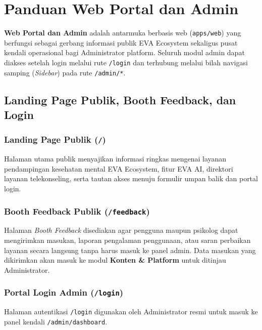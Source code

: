\chapter{Panduan Web Portal dan Admin}
\label{chap:web-portal-admin}

\textbf{Web Portal dan Admin} adalah antarmuka berbasis web (\texttt{apps/web}) yang berfungsi sebagai gerbang informasi publik EVA Ecosystem sekaligus pusat kendali operasional bagi Administrator platform. Seluruh modul admin dapat diakses setelah login melalui rute \texttt{/login} dan terhubung melalui bilah navigasi samping (\textit{Sidebar}) pada rute \texttt{/admin/*}.

\section{Landing Page Publik, Booth Feedback, dan Login}

\subsection{Landing Page Publik (\texttt{/})}
Halaman utama publik menyajikan informasi ringkas mengenai layanan pendampingan kesehatan mental EVA Ecosystem, fitur EVA AI, direktori layanan telekonseling, serta tautan akses menuju formulir umpan balik dan portal login.


\subsection{Booth Feedback Publik (\texttt{/feedback})}
Halaman \textit{Booth Feedback} disediakan agar pengguna maupun psikolog dapat mengirimkan masukan, laporan pengalaman penggunaan, atau saran perbaikan layanan secara langsung tanpa harus masuk ke panel admin. Data masukan yang dikirimkan akan masuk ke modul \textbf{Konten \& Platform} untuk ditinjau Administrator.


\subsection{Portal Login Admin (\texttt{/login})}
Halaman autentikasi \texttt{/login} digunakan oleh Administrator resmi untuk masuk ke panel kendali \texttt{/admin/dashboard}.


